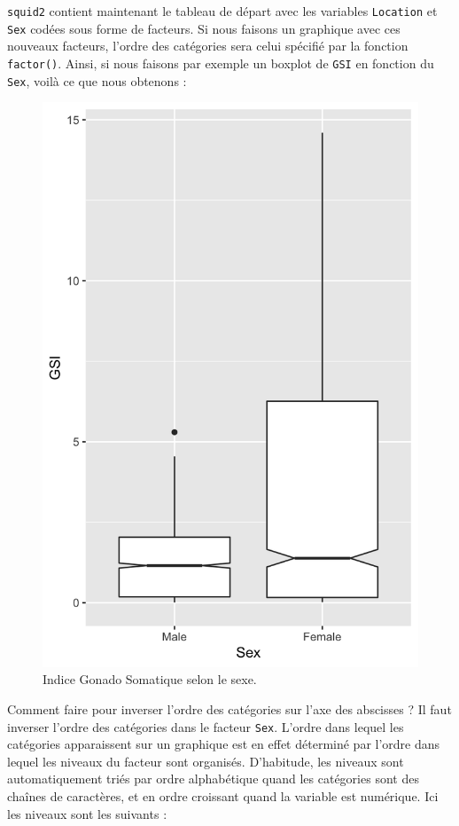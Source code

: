 \documentclass[
  a4paper,
]{article}
\newenvironment{Shaded}{\begin{snugshade}}{\end{snugshade}}
\newcommand{\DataTypeTok}[1]{\textcolor[rgb]{0.00,0.34,0.68}{#1}}
\newcommand{\KeywordTok}[1]{\textcolor[rgb]{0.12,0.11,0.11}{\textbf{#1}}}
\newcommand{\NormalTok}[1]{\textcolor[rgb]{0.12,0.11,0.11}{#1}}
\newcommand{\OperatorTok}[1]{\textcolor[rgb]{0.12,0.11,0.11}{#1}}
\newcommand{\OtherTok}[1]{\textcolor[rgb]{0.00,0.43,0.16}{#1}}
\newcommand{\StringTok}[1]{\textcolor[rgb]{0.75,0.01,0.01}{#1}}
\begin{document}
\texttt{squid2} contient maintenant le tableau de départ avec les variables \texttt{Location} et \texttt{Sex} codées sous forme de facteurs. Si nous faisons un graphique avec ces nouveaux facteurs, l'ordre des catégories sera celui spécifié par la fonction \texttt{factor()}. Ainsi, si nous faisons par exemple un boxplot de \texttt{GSI} en fonction du \texttt{Sex}, voilà ce que nous obtenons :

\begin{Shaded}
\end{Shaded}

\begin{figure}[htpb]

{\centering \includegraphics[width=0.5\linewidth]{figure/unnamed-chunk-136-1} 

}

\caption{Indice Gonado Somatique  selon le sexe.}\label{fig:unnamed-chunk-136}
\end{figure}

Comment faire pour inverser l'ordre des catégories sur l'axe des abscisses ? Il faut inverser l'ordre des catégories dans le facteur \texttt{Sex}. L'ordre dans lequel les catégories apparaissent sur un graphique est en effet déterminé par l'ordre dans lequel les niveaux du facteur sont organisés. D'habitude, les niveaux sont automatiquement triés par ordre alphabétique quand les catégories sont des chaînes de caractères, et en ordre croissant quand la variable est numérique. Ici les niveaux sont les suivants :
\end{document}
